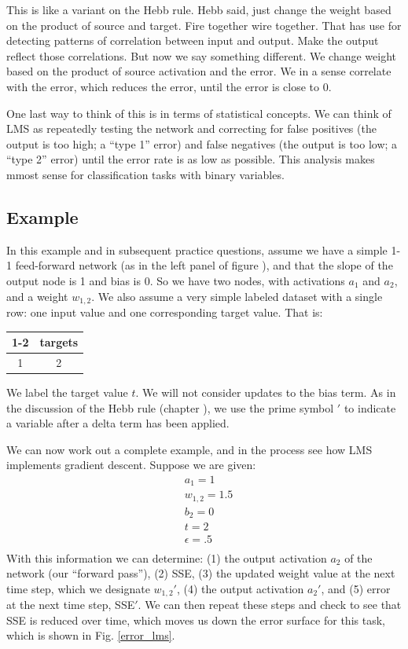 This is like a variant on the Hebb rule. Hebb said, just change the weight based on the product of source and target. Fire together wire together. That has use for detecting patterns of correlation between input and output. Make the output reflect those correlations. But now we say something different. We change weight based on the product of source activation and the error. We in a sense correlate with the error, which reduces the error, until the error is close to 0.

One last way to think of this is in terms of statistical concepts. We can think of LMS as repeatedly testing the network and correcting for false positives (the output is too high; a ``type 1'' error) and false negatives (the output is too low; a ``type 2'' error) until the error rate is as low as possible. This analysis makes mmost sense for classification tasks with binary variables.
 
\subsection{Example}\label{lms_example}

In this example and in subsequent practice questions, assume we have a  simple 1-1 feed-forward network (as in the left panel of figure ), and that the slope of the output node is 1 and bias is 0. So we have two nodes, with activations $a_1$ and $a_2$, and a weight $w_{1,2}$. We also assume a very simple labeled dataset with a single row: one input value and one corresponding target value. That is:
\begin{center}
\begin{tabular}{| c || c | }
\cline{1-2}
\multicolumn{1}{| c || }{inputs}
 & \multicolumn{1}{c|}{targets} \\
\hline
  1 & 2  \\
\hline
\end{tabular}
\end{center}
We label the target value $t$. We will not consider updates to the bias term. As in the discussion of the Hebb rule (chapter ), we use the prime symbol $'$ to indicate a variable after a delta term has been applied.

We can now work out a complete example, and in the process see how LMS implements gradient descent. Suppose we are given:
\begin{eqnarray*}
& a_1 = 1 \\
& w_{1,2} = 1.5 \\
& b_2 = 0 \\
& t = 2  \\
& \epsilon = .5  \\
\end{eqnarray*}
With this information we can determine: (1) the output activation $a_2$ of the network (our ``forward pass''), (2) SSE, (3) the updated weight value at the next time step, which we designate $w_{1,2}'$, (4) the output activation $a_2'$, and (5) error at the next time step, SSE$'$. We can then repeat these steps and check to see that SSE is reduced over time, which moves us down the error surface for this task, which is shown in Fig. \ref{error_lms}.

